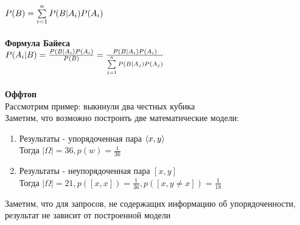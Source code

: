 \documentclass[12pt]{article}
\begin{document}
$P(B) = \sum\limits_{i = 1}^n P(B|A_i)P(A_i)$\\\\
\textbf{Формула Байеса}\\
$P(A_i|B) = \frac{P(B|A_i)P(A_i)}{P(B)} = \frac{P(B|A_i)P(A_i)}{\sum\limits_{j = 1}^n P(B|A_j)P(A_j)}$\\\\
\textbf{Оффтоп}\\
Рассмотрим пример: выкинули два честных кубика\\
Заметим, что возможно построить две математические модели:
\begin{enumerate}
    \item Результаты - упорядоченная пара $\langle x, y \rangle$\\
    Тогда $|\Omega| = 36, p(w) = \frac{1}{36}$
    \item Результаты - неупорядоченная пара $[ x, y ]$\\
    Тогда $|\Omega| = 21, p([x,x]) = \frac{1}{36}, p([x,y\neq x]) = \frac{1}{18}$
\end{enumerate}
Заметим, что для запросов, не содержащих информацию об упорядоченности, результат не зависит от построенной модели
\end{document}
